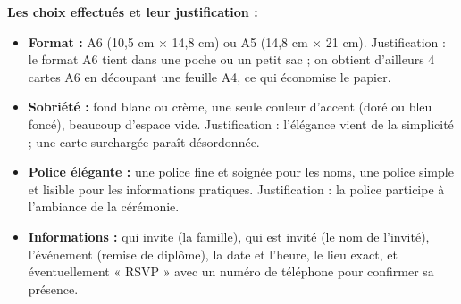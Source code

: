 \documentclass[11pt]{article}
\begin{document}
\textbf{Les choix effectués et leur justification :}

\begin{itemize}
  \item \textbf{Format :} A6 (10,5 cm $\times$ 14,8 cm) ou A5 (14,8 cm $\times$ 21 cm). Justification : le format A6 tient dans une poche ou un petit sac ; on obtient d'ailleurs 4 cartes A6 en découpant une feuille A4, ce qui économise le papier.
  \item \textbf{Sobriété :} fond blanc ou crème, une seule couleur d'accent (doré ou bleu foncé), beaucoup d'espace vide. Justification : l'élégance vient de la simplicité ; une carte surchargée paraît désordonnée.
  \item \textbf{Police élégante :} une police fine et soignée pour les noms, une police simple et lisible pour les informations pratiques. Justification : la police participe à l'ambiance de la cérémonie.
  \item \textbf{Informations :} qui invite (la famille), qui est invité (le nom de l'invité), l'événement (remise de diplôme), la date et l'heure, le lieu exact, et éventuellement « RSVP » avec un numéro de téléphone pour confirmer sa présence.
\end{itemize}
\end{document}

